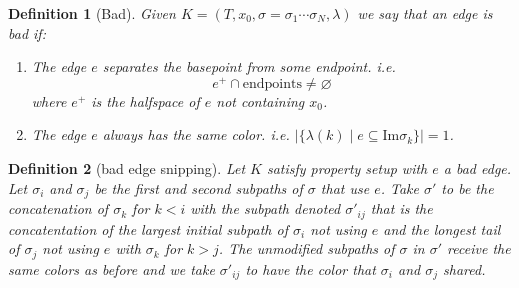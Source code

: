 \documentclass{article}
\theoremstyle{mystyle}
\newtheorem{defn}{Definition}
\theoremstyle{remark}
\begin{document}
\begin{defn}
    [Bad]
    Given \(K = (T, x_{0},\sigma=\sigma_{1}\cdots\sigma_{N},\lambda)\) we say that an edge is {\em bad} if:
    \begin{enumerate}
        \item The edge \(e\) separates the basepoint from some endpoint. i.e. \[e^{+} \cap \text{endpoints} \neq \varnothing\] where \(e^{+}\) is the halfspace of \(e\) not containing \(x_{0}\).
        \item The edge \(e\) always has the same color. i.e. \(\left| \{\lambda (k) \mid e \subseteq \text{Im} \sigma_{k}\} \right|=1\).
    \end{enumerate}
\end{defn}

\begin{defn}
	[bad edge snipping]
    Let \(K\) satisfy property setup with \(e\) a bad edge. Let \(\sigma_{i}\) and \(\sigma_{j}\) be the first and second subpaths of \(\sigma\) that use \(e\). Take \(\sigma '\) to be the concatenation of \(\sigma_{k}\) for \(k < i\) with the subpath denoted \(\sigma '_{ij}\) that is the concatentation of the largest initial subpath of \(\sigma_{i}\) not using \(e\) and the longest tail of \(\sigma_j\) not using \(e\) with \(\sigma_{k}\) for \(k > j\). The unmodified subpaths of \(\sigma\) in \(\sigma '\) receive the same colors as before and we take \(\sigma '_{ij}\) to have the color that \(\sigma_{i}\) and \(\sigma_{j}\) shared.
\end{defn}
\end{document}
